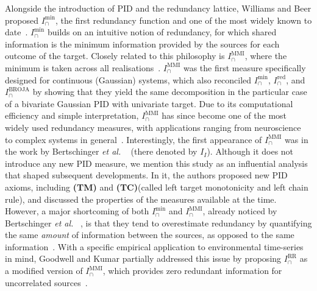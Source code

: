\documentclass{article}
\makeatletter
\newcommand{\etal}{\textit{et al.\@} }
\newcommand{\TM}{\textbf{(TM)}\xspace} %
\newcommand{\TC}{\textbf{(TC)}\xspace} %
\newcommand{\Imin}{\ensuremath{I_\cap^{\text{min}}}\xspace}
\newcommand{\Ired}{\ensuremath{I^{\text{red}}_\cap}\xspace}
\newcommand{\IBROJA}{\ensuremath{I_\cap^{\text{BROJA}}}\xspace}
\newcommand{\IMMI}{\ensuremath{I_\cap^{\text{MMI}}}\xspace}
\newcommand{\IRR}{\ensuremath{I_\cap^{\text{RR}}}\xspace}
\makeatother
\begin{document}
Alongside the introduction of PID and the redundancy lattice, Williams and Beer proposed \Imin, the first redundancy function and one of the most widely known to date~\cite{williams2010nonnegative}. \Imin builds on an intuitive notion of redundancy, for which shared information is the minimum information provided by the sources for each outcome of the target. 
Closely related to this philosophy is \IMMI, where the minimum is taken across all realisations~\cite{barrett2010multivariate}.
\IMMI was the first measure specifically designed for continuous (Gaussian) systems, which also reconciled \Imin, \Ired, and \IBROJA by showing that they yield the same decomposition in the particular case of a bivariate Gaussian PID with univariate target. Due to its computational efficiency and simple interpretation, \IMMI has since become one of the most widely used redundancy measures, with applications ranging from neuroscience~\cite{luppi2020synergisticCore} to complex systems in general~\cite{mediano2025toward}. 
Interestingly, the first appearance of \IMMI was in the work by Bertschinger \etal~\cite{bertschinger2013shared} (there denoted by $I_I$).
Although it does not introduce any new PID measure, we mention this study as an influential analysis that shaped subsequent developments. In it, the authors proposed new PID axioms, including \TM and \TC (called left target monotonicity and left chain rule), and discussed the properties of the measures available at the time.
However, a major shortcoming of both \Imin and \IMMI, already noticed by Bertschinger \etal~\cite{bertschinger2013shared}, is that they tend to overestimate redundancy by quantifying the same \textit{amount} of information between the sources, as opposed to the same information~\cite{bertschinger2013shared, harder2013bivariate, griffith2014quantifying}.
With a specific empirical application to environmental time-series in mind, Goodwell and Kumar partially addressed this issue by proposing \IRR as a modified version of \IMMI, which provides zero redundant information for uncorrelated sources~\cite{goodwell2017temporal}.
\end{document}
